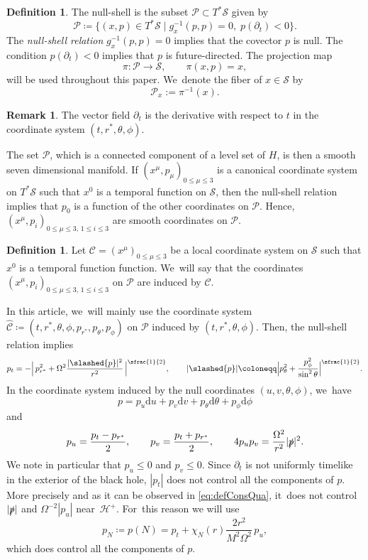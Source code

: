 \documentclass[JEP,XML,SOM,Unicode,published]{cedram}
\theoremstyle{plain}
\theoremstyle{definition}
\newtheorem{definition}[proposition]{Definition}
\newtheorem{remark}[proposition]{Remark}
\renewcommand\H{{\mathcal{H}^+}}
\newcommand\dr{{\mathrm{d}}}
\begin{document}
\begin{definition}
The null-shell is the subset $\mathcal{P}\subset T^*\mathcal{S}$ given by
\[
\mathcal{P} \coloneqq \bigl\{(x,p)\in T^*\mathcal{S}\mid g^{-1}_x(p,p)=0, \; p(\partial_t) <0 \bigr\}.
\]
The \emph{null-shell relation} $g^{-1}_x(p,p)=0$ implies that the covector $p$ is null. The condition $p(\partial_t)<0$ implies that $p$ is future-directed. The projection map
\[
\pi \colon \mathcal{P} \to \mathcal{S},\qquad \pi (x,p)=x,
\]
will be used throughout this paper. We~denote the fiber of $x \in \mathcal{S}$ by
\[
\mathcal{P}_x := \pi^{-1}(x).
\]
\end{definition}
\begin{remark}
The vector field $\partial_t$ is the derivative with respect to $t$ in the coordinate system $(t,r^*,\theta, \phi)$.
\end{remark}

The set $\mathcal{P}$, which is a connected component of a level set of $H$, is then a smooth seven dimensional manifold. If $(x^\mu,p_\mu)_{0 \leq \mu \leq 3}$ is a canonical coordinate system on $T^* \mathcal{S}$ such that $x^0$ is a temporal function on $\mathcal{S}$, then the null-shell relation implies that $p_0$ is a function of the other coordinates on $\mathcal{P}$. Hence, $(x^\mu,p_i)_{0 \leq \mu \leq 3, \, 1 \leq i \leq 3}$ are smooth coordinates on $\mathcal{P}$.

\begin{definition}
Let $\mathscr{C}=(x^{\mu})_{0 \leq \mu \leq 3}$ be a local coordinate system on $\mathcal{S}$ such that $x^0$ is a temporal function function. We~will say that the coordinates $(x^\mu,p_i)_{0 \leq \mu \leq 3, \, 1 \leq i \leq 3}$ on $\mathcal{P}$ are induced by $\mathscr{C}$.
\end{definition}

In this article, we~will mainly use the coordinate system $\widehat{\mathscr{C}} \coloneqq (t,r^*,\theta, \phi, p_{r^*},p_\theta, p_\phi)$ on $\mathcal{P}$ induced by $(t,r^*,\theta, \phi)$. Then, the null-shell relation implies
\begin{equation}\label{eq:defConsQua}
p_t = - \Big| \,p_{r^*}^2 + \Omega^2 \frac{|\slashed{p}|^2}{r^2} \, \Big|^{\sfrac{1}{2}},\qquad |\slashed{p}| \coloneqq \Big|p_{\theta}^2+\frac{ p_{\phi}^2}{\sin^2 \theta }\Big|^{\sfrac{1}{2}}.
\end{equation}
In the coordinate system induced by the null coordinates $(u,v,\theta, \phi)$, we~have
\[
p= p_u \dr u +p_v \dr v +p_\theta \dr \theta + p_\phi \dr \phi
\]
and
\[
p_u = \frac{p_t-p_{r^*}}{2}, \qquad p_v = \frac{p_t+p_{r^*}}{2}, \qquad 4p_up_v = \frac{\Omega^2}{r^2}|\slashed{p}|^2.
\]
We note in particular that $p_u \leq 0$ and $p_v \leq 0$. Since $\partial_t$ is not uniformly timelike in the exterior of the black hole, $|p_t|$ does not control all the components of $p$. More precisely and as it can be observed in \eqref{eq:defConsQua}, it~does not control $|\slashed{p}|$ and $\Omega^{-2}|p_u|$ near~$\H$. For~this reason we will use
\begin{equation}\label{eq:defpN}
p_N\coloneqq p(N)= p_t+ \chi_N (r) \frac{2r^2}{M^2\Omega^2}\, p_u,
\end{equation}
which does control all the components of $p$.
\end{document}
